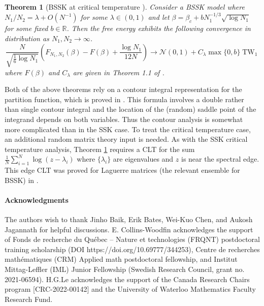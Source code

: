 \documentclass[11pt]{article}
\numberwithin{equation}{section}
\newcommand{\beq}{ \begin{equation} }
\newcommand{\eeq}{ \end{equation} }
\def \b {\beta}
\def \la {\lambda}
\def \RR {\mathbb{R}}
\def \cN {\mathcal{N}}
\newtheorem{theorem}{Theorem}[section]
\theoremstyle{remark}
\DeclareMathOperator{\TW}{TW}
\begin{document}
\begin{theorem}[BSSK at critical temperature \cite{CWL_BSSK}]\label{thm:BSSK_crit} Consider a BSSK model where $N_1/N_2=\la+O(N^{-1})$ for some $\lambda\in(0,1)$ and let $\b=\b_c+bN_1^{-1/3}\sqrt{\log N_1}$ for some fixed $b\in\RR$.  Then the free energy exhibits the following convergence in distribution as $N_1,N_2\to\infty$.
\beq
\frac{N}{\sqrt{\frac16\log N_1}}\left(F_{N_1,N_2}(\b)-F(\b)+\frac{\log N_1}{12N}\right)\to\cN(0,1)+C_\la\max\{0,b\}\TW_1
\eeq
where $F(\b)$ and $C_\la$ are given in Theorem 1.1 of \cite{CWL_BSSK}.
\end{theorem}
Both of the above theorems rely on a contour integral representation for the partition function, which is proved in \cite{BaikLeeBipartite}.  This formula involves a double rather than single contour integral and the location of the (random) saddle point of the integrand depends on both variables.  Thus the contour analysis is somewhat more complicated than in the SSK case.  To treat the critical temperature case, an additional random matrix theory input is needed.  As with the SSK critical temperature analysis, Theorem \ref{thm:BSSK_crit} requires a CLT for the sum $\frac1N\sum_{i=1}^N\log(z-\la_i)$ where $\{\la_i\}$ are eigenvalues and $z$ is near the spectral edge.  This edge CLT was proved for Laguerre matrices (the relevant ensemble for BSSK) in \cite{CWL_CLT}.


\paragraph*{Acknowledgments}
The authors wish to thank Jinho Baik, Erik Bates, Wei-Kuo Chen, and Aukosh Jagannath for helpful discussions. 
E. Collins-Woodfin acknowledges the support of Fonds de recherche du Qu\'ebec – Nature et technologies
(FRQNT) postdoctoral training scholarship (DOI https://doi.org/10.69777/344253), Centre de recherches math\'ematiques (CRM) Applied
math postdoctoral fellowship, and Institut Mittag-Leffler (IML) Junior Fellowship (Swedish Research Council, grant no. 2021-06594).
H.\@ G.\@ Le acknowledges the support of the Canada Research Chairs program [CRC-2022-00142] and  the University of Waterloo Mathematics Faculty Research Fund.



\newpage



\end{document}
